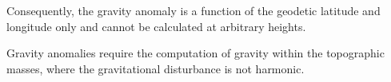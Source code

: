 \documentclass[manuscript]{geophysics}
\begin{document}
Consequently, the gravity anomaly is a function of
the geodetic latitude and longitude only and cannot
be calculated at arbitrary heights.


Gravity anomalies require the computation of gravity
within the topographic masses, where the gravitational
disturbance is not harmonic.






\clearpage

\end{document}
